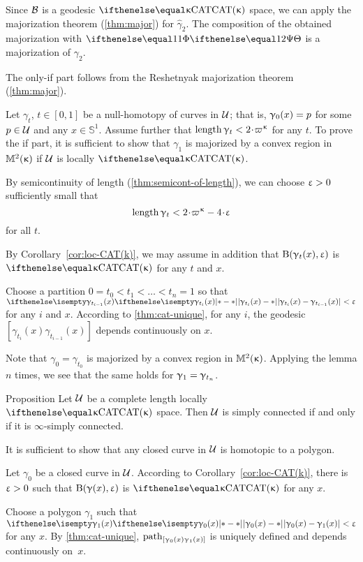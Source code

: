 Since $\mathcal{B}$ is a geodesic $\CAT\kappa$ space, we can apply the majorization theorem (\ref{thm:major}) for $\hat\gamma_2$.
The composition of the obtained majorization with $\map$ is a majorization of $\gamma_2$.
\qeds

The only-if part follows from the Reshetnyak majorization theorem (\ref{thm:major}).

Let  $\gamma_t$, $t\in[0,1]$ 
be a null-homotopy of curves in $\mathcal{U}$;
that is, $\gamma_0(x)\z=p$ for some $p\in \spc{U}$
and any $x\in\mathbb{S}^1$.
Assume further that $\length \gamma_t\z<2\cdot\varpi\kappa$ for any $t$.
To prove the if part, it is sufficient to show that $\gamma_1$ is majorized by a convex region in $\mathbb{M}_{{}}^{2}({\upkappa})$ if $\mathcal{U}$ is locally $\CAT\kappa$. 

By semicontinuity of length (\ref{thm:semicont-of-length}),
we can choose  $\upvarepsilon>0$ sufficiently small that
$$\length \gamma_t<2\cdot\varpi\kappa-4\cdot\eps$$
for all $t$.

By Corollary~\ref{cor:loc-CAT(k)},
we may assume in addition that
$\mathrm{B}{}(\upgamma_t(x),\upvarepsilon)$ is $\CAT\kappa$ 
for any $t$ and $x$.

Choose a partition $0=t_0<t_1<\dots<t_n=1$
so that $\dist{\gamma_{t_i}(x)}{\gamma_{t_{i-1}}(x)}{}<\eps$
for any $i$ and $x$.
According to \ref{thm:cat-unique},
for any $i$,
the geodesic $[\gamma_{t_i}(x)\gamma_{t_{i-1}}(x)]$ depends continuously on $x$.

Note that $\gamma_0=\gamma_{t_0}$ is majorized by a convex region in $\mathbb{M}_{{}}^{2}({\upkappa})$.
Applying the lemma $n$ times, we see that the same holds for $\gamma_1\z=\gamma_{t_n}$.
\qeds

\begin{thm}{Proposition}\label{prop:sc}
Let $\mathcal{U}$ be a complete length locally $\CAT\kappa$ space.
Then $\mathcal{U}$ is simply connected if and only if it is $\infty$-simply connected.
\end{thm}

It is sufficient to show that any closed curve in $\mathcal{U}$ is homotopic to a polygon.

Let $\gamma_0$ be a closed curve in $\mathcal{U}$.
According to Corollary~\ref{cor:loc-CAT(k)},
there is $\upvarepsilon>0$ such that 
$\mathrm{B}{}(\upgamma(x),\upvarepsilon)$ is $\CAT\kappa$
for any $x$.

Choose a polygon $\gamma_1$ such that $\dist{\gamma_0(x)}{\gamma_1(x)}{}<\eps$ for any $x$.
By \ref{thm:cat-unique}, 
$\mathrm{path}_{[\upgamma_0(x)\upgamma_1(x)]}$ 
is uniquely defined 
and depends continuously on~$x$.

